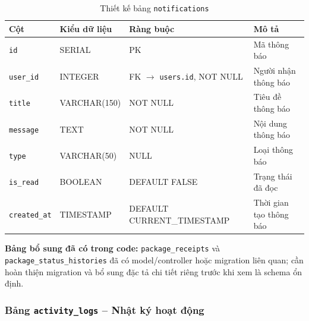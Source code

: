 \begin{table}[H]
\centering
\caption{Thiết kế bảng \texttt{notifications}}
\begin{tabularx}{\textwidth}{|l|l|Z|Z|}
\hline
\textbf{Cột} &
\textbf{Kiểu dữ liệu} &
\textbf{Ràng buộc} &
\textbf{Mô tả} \\ \hline

\texttt{id}
& SERIAL
& PK
& Mã thông báo \\ \hline

\texttt{user\_id}
& INTEGER
& FK $\rightarrow$ \texttt{users.id}, NOT NULL
& Người nhận thông báo \\ \hline

\texttt{title}
& VARCHAR(150)
& NOT NULL
& Tiêu đề thông báo \\ \hline

\texttt{message}
& TEXT
& NOT NULL
& Nội dung thông báo \\ \hline

\texttt{type}
& VARCHAR(50)
& NULL
& Loại thông báo \\ \hline

\texttt{is\_read}
& BOOLEAN
& DEFAULT FALSE
& Trạng thái đã đọc \\ \hline

\texttt{created\_at}
& TIMESTAMP
& DEFAULT CURRENT\_TIMESTAMP
& Thời gian tạo thông báo \\ \hline

\end{tabularx}
\end{table}

\textbf{Bảng bổ sung đã có trong code:} \texttt{package\_receipts} và \texttt{package\_status\_histories} đã có model/controller hoặc migration liên quan; cần hoàn thiện migration và bổ sung đặc tả chi tiết riêng trước khi xem là schema ổn định.


\iffalse

\subsubsection{Bảng \texttt{activity\_logs} -- Nhật ký hoạt động}

